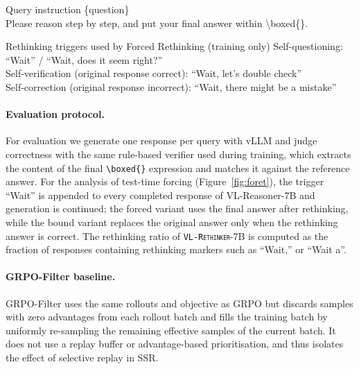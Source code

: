 \documentclass{article}
\newcommand{\model}{\texttt{\textsc{VL-Rethinker}}\xspace}
\begin{document}
\begin{promptbox}{Query instruction}
\small
\{question\}\\[2pt]
Please reason step by step, and put your final answer within \textbackslash boxed\{\}.
\end{promptbox}

\begin{promptbox}{Rethinking triggers used by Forced Rethinking (training only)}
\small
Self-questioning: ``Wait'' \quad / \quad ``Wait, does it seem right?''\\
Self-verification (original response correct): ``Wait, let's double check''\\
Self-correction (original response incorrect): ``Wait, there might be a mistake''
\end{promptbox}

\paragraph{Evaluation protocol.} For evaluation we generate one response per query with vLLM and judge correctness with the same rule-based verifier used during training, which extracts the content of the final \texttt{\textbackslash boxed\{\}} expression and matches it against the reference answer. For the analysis of test-time forcing (Figure~\ref{fig:foret}), the trigger ``Wait'' is appended to every completed response of VL-Reasoner-7B and generation is continued; the forced variant uses the final answer after rethinking, while the bound variant replaces the original answer only when the rethinking answer is correct. The rethinking ratio of \model-7B is computed as the fraction of responses containing rethinking markers such as ``Wait,'' or ``Wait a''.

\paragraph{GRPO-Filter baseline.} GRPO-Filter uses the same rollouts and objective as GRPO but discards samples with zero advantages from each rollout batch and fills the training batch by uniformly re-sampling the remaining effective samples of the current batch. It does not use a replay buffer or advantage-based prioritisation, and thus isolates the effect of selective replay in SSR.
\end{document}
